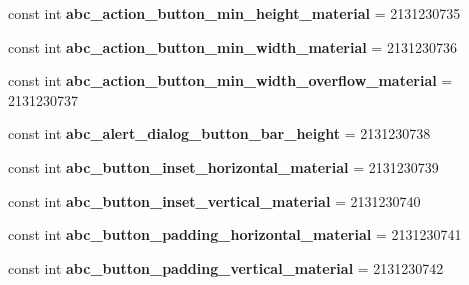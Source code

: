 \begin{DoxyCompactItemize}
\item 
\mbox{\label{classst_delivery_1_1_resource_1_1_dimension_a2d2568b04d105010da154252db9ed774}} 
const int {\bfseries abc\+\_\+action\+\_\+button\+\_\+min\+\_\+height\+\_\+material} = 2131230735
\item 
\mbox{\label{classst_delivery_1_1_resource_1_1_dimension_a90733a11898b0e48167ce2dd6fe63919}} 
const int {\bfseries abc\+\_\+action\+\_\+button\+\_\+min\+\_\+width\+\_\+material} = 2131230736
\item 
\mbox{\label{classst_delivery_1_1_resource_1_1_dimension_af7478aa8f08d48874def9ded3fd1f06f}} 
const int {\bfseries abc\+\_\+action\+\_\+button\+\_\+min\+\_\+width\+\_\+overflow\+\_\+material} = 2131230737
\item 
\mbox{\label{classst_delivery_1_1_resource_1_1_dimension_a1353d938bb621f248c9d5cb829b5b631}} 
const int {\bfseries abc\+\_\+alert\+\_\+dialog\+\_\+button\+\_\+bar\+\_\+height} = 2131230738
\item 
\mbox{\label{classst_delivery_1_1_resource_1_1_dimension_abaf6420ddd14cf1d18e6265d7ceaada5}} 
const int {\bfseries abc\+\_\+button\+\_\+inset\+\_\+horizontal\+\_\+material} = 2131230739
\item 
\mbox{\label{classst_delivery_1_1_resource_1_1_dimension_a917441a93d942e48891c60e117a7f79a}} 
const int {\bfseries abc\+\_\+button\+\_\+inset\+\_\+vertical\+\_\+material} = 2131230740
\item 
\mbox{\label{classst_delivery_1_1_resource_1_1_dimension_ad68d298f5874e4593d3326fe3ec42800}} 
const int {\bfseries abc\+\_\+button\+\_\+padding\+\_\+horizontal\+\_\+material} = 2131230741
\item 
\mbox{\label{classst_delivery_1_1_resource_1_1_dimension_a579d386411e4f784d0a84598132d1c0c}} 
const int {\bfseries abc\+\_\+button\+\_\+padding\+\_\+vertical\+\_\+material} = 2131230742

\end{DoxyCompactItemize}
